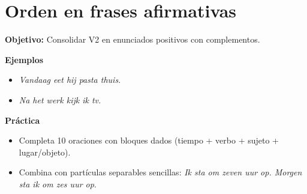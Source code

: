 \section{Orden en frases afirmativas}
\textbf{Objetivo:} Consolidar V2 en enunciados positivos con complementos.

\textbf{Ejemplos}
\begin{itemize}[leftmargin=*]
  \item \textit{Vandaag eet hij pasta thuis.}
  \item \textit{Na het werk kijk ik tv.}
\end{itemize}

\textbf{Práctica}
\begin{itemize}[leftmargin=*]
  \item Completa 10 oraciones con bloques dados (tiempo + verbo + sujeto + lugar/objeto).
  \item Combina con partículas separables sencillas: \textit{Ik sta om zeven uur op. Morgen sta ik om zes uur op}.
\end{itemize}
